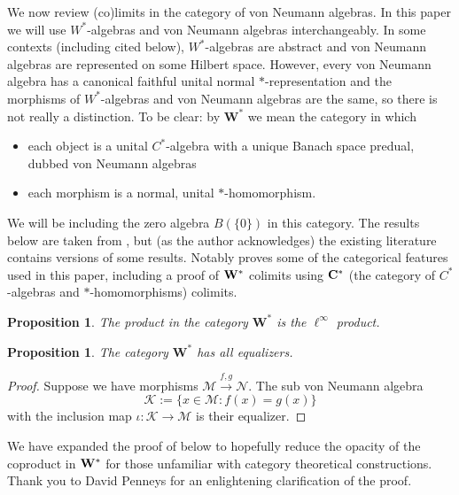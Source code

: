 \documentclass[12pt]{article}
\newtheorem{proposition}[theorem]{Proposition}
\theoremstyle{definition}
\newcommand{\mc}[1]{\mathcal{#1}}
\newcommand{\<}{\langle}
\renewcommand{\>}{\rangle}
\begin{document}
We now review (co)limits in the category of von Neumann algebras. In this paper we will use $W^*$-algebras and von Neumann algebras interchangeably. In some contexts (including \cite{kornell} cited below), $W^*$-algebras are abstract and von Neumann algebras are represented on some Hilbert space. However, every von Neumann algebra has a canonical faithful unital normal $*$-representation and the morphisms of $W^*$-algebras and von Neumann algebras are the same, so there is not really a distinction. To be clear: by $\mathbf{W^*}$ we mean the category in which 
\begin{itemize}
    \item each object is a unital $C^*$-algebra with a unique Banach space predual, dubbed von Neumann algebras
    \item each morphism is a normal, unital $*$-homomorphism.
\end{itemize}
We will be including the zero algebra $B(\{0\})$ in this category. The results below are taken from \cite{kornell}, but (as the author acknowledges) the existing literature contains versions of some results. Notably \cite{guichardet} proves some of the categorical features used in this paper, including a proof of ${\bf W^*}$ colimits using ${\bf C^*}$ (the category of $C^*$-algebras and $*$-homomorphisms) colimits.

\begin{proposition} 
    The product in the category $\mathbf{W^*}$ is the $\ell^\infty$ product.    
\end{proposition} 

\begin{proposition} \label{prop: w*equalizers}
    The category $\mathbf{W^*}$ has all equalizers.
\end{proposition}
\begin{proof}
    Suppose we have morphisms $\mc M \overset{f,g}{\to} \mc N$. The sub von Neumann algebra 
    \[
    \mc K := \{x \in \mc M : f(x) = g(x)\} 
    \]
    with the inclusion map $\iota : \mc K \to \mc M$ is their equalizer.
\end{proof}

We have expanded the proof of \cite[Theorem 5.5]{kornell} below to hopefully reduce the opacity of the coproduct in ${\bf W^*}$ for those unfamiliar with category theoretical constructions. Thank you to David Penneys for an enlightening clarification of the proof.
\end{document}
